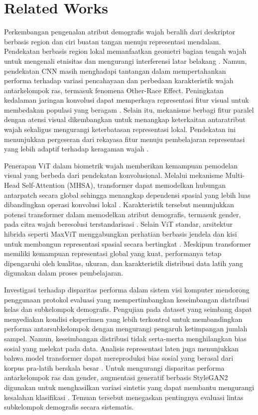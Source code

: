 \section{Related Works}
\label{sec:related_works}

Perkembangan pengenalan atribut demografis wajah beralih dari deskriptor berbasis region dan ciri buatan tangan menuju representasi mendalam. Pendekatan berbasis region lokal memanfaatkan geometri bagian tengah wajah untuk mengenali etnisitas dan mengurangi interferensi latar belakang \cite{ref11}. Namun, pendekatan CNN masih menghadapi tantangan dalam mempertahankan performa terhadap variasi pencahayaan dan perbedaan karakteristik wajah antarkelompok ras, termasuk fenomena Other-Race Effect. Peningkatan kedalaman jaringan konvolusi dapat memperkaya representasi fitur visual untuk membedakan populasi yang beragam \cite{ref13}. Selain itu, mekanisme berbagi fitur paralel dengan atensi visual dikembangkan untuk menangkap keterkaitan antaratribut wajah sekaligus mengurangi keterbatasan representasi lokal. Pendekatan ini menunjukkan pergeseran dari rekayasa fitur menuju pembelajaran representasi yang lebih adaptif terhadap keragaman wajah \cite{ref16}.

Penerapan ViT dalam biometrik wajah memberikan kemampuan pemodelan visual yang berbeda dari pendekatan konvolusional. Melalui mekanisme Multi-Head Self-Attention (MHSA), transformer dapat memodelkan hubungan antarpatch secara global sehingga menangkap dependensi spasial yang lebih luas dibandingkan operasi konvolusi lokal \cite{ref14}. Karakteristik tersebut menunjukkan potensi transformer dalam memodelkan atribut demografis, termasuk gender, pada citra wajah beresolusi terstandarisasi \cite{ref17}. Selain ViT standar, arsitektur hibrida seperti MaxViT menggabungkan perhatian berbasis jendela dan kisi untuk membangun representasi spasial secara bertingkat \cite{ref18}. Meskipun transformer memiliki kemampuan representasi global yang kuat, performanya tetap dipengaruhi oleh kualitas, ukuran, dan karakteristik distribusi data latih yang digunakan dalam proses pembelajaran.

Investigasi terhadap disparitas performa dalam sistem visi komputer mendorong penggunaan protokol evaluasi yang mempertimbangkan keseimbangan distribusi kelas dan subkelompok demografis. Pengujian pada dataset yang seimbang dapat menyediakan kondisi eksperimen yang lebih terkontrol untuk membandingkan performa antarsubkelompok dengan mengurangi pengaruh ketimpangan jumlah sampel. Namun, keseimbangan distribusi tidak serta-merta menghilangkan bias sosial yang melekat pada data. Analisis representasi laten juga menunjukkan bahwa model transformer dapat mereproduksi bias sosial yang berasal dari korpus pra-latih berskala besar \cite{ref14}. Untuk mengurangi disparitas performa antarkelompok ras dan gender, augmentasi generatif berbasis StyleGAN2 digunakan untuk menghasilkan variasi sintetis yang dapat membantu mengurangi kesalahan klasifikasi \cite{ref15}. Temuan tersebut menegaskan pentingnya evaluasi lintas subkelompok demografis secara sistematis.


